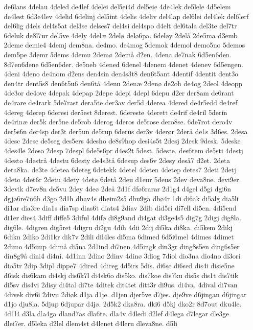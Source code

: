 {de6lans
4delau
4deled
de4lef
4delei
del5ei4d
del5eie
4de4lek
de5lele
4d5elem
de4lest
6d3e4lev
4delid
6delinj
del5int
4delis
4deliv
del4lap
del6lei
del4lek
del6lerf
del6lig
d4els
del4s5at
del3se
delses7
del4si
del4spo
d4elt
del6tala
del3te
del7tr
6deluk
de8l7ur
del5ve
4dely
4delæ
2delø
delø6pa.
6deløy
2delå
2de5ma
d3emb
2deme
demie4
4demj
dem8na.
de4mo.
de4mog
5demok
4demol
demo5no
5demos
dem5pe
3demr
5dems
4demu
2demø
2demå
d2en.
4dena
de7nak
6d5en6den.
8d7en6dene
6d5en6der.
de5neb
4dened
6denel
4denem
4denet
4denev
6d5engen.
4deni
4deno
de4nom
d2ens
den4sin
den4s3t8
den6t5ant
4dentif
4dentit
dent3o
den4tr
dent5s8
den6t5u6
den6tå
4denu
2denæ
2denø
de2ob
de4og
2deol
4deopp
4de3or
de4ove
4depak
4depap
2depe
4depi
4depl
6depu
d2er
der8am
de6rant
de4rare
de4rark
5de7rast
dera5te
der3av
der5d
4derea
4dered
de4r5edd
de4ref
4dereg
4derep
6deresi
der5est
8derest.
6dereste
4derett
de4rif
de4ril
5derin
de4rinæ
der5k
der5ne
de5rob
4derog
4deros
de5rose
dero8se.
6de7rot
dero4v
der5s6n
der4sp
der3t
der5un
de5rup
6derus
der3v
4derør
2derå
de1s
3d6es.
2desa
4desc
2dese
de5seg
des5ers
4desho
de8s9hop
desi4s5t
2desj
2desk
9desk.
5deske
4des4le
2deso
2desp
7despl
6de5s6pr
d4es2t
5dest.
5deste.
des6tem
de5sti
4destj
4desto
4destrå
4destu
6desty
de4s3tå
6desup
des6v
2desy
deså7
d2et.
2deta
deta8ka.
de3te
4detea
6deteg
6detekk
4detel
4deten
4detep
detes7
2deti
2detj
4deto
4det6r
2detu
4dety
4detø
6detå
2deu
d1eur
5deus
2dev
deva8ne.
devi9er.
3devik
d7ev8n
de5vu
2dey
4deø
2deå
2d1f
dfø6rarar
2d1g4
d4gel
d5gi
dgi6n
dgjø6re7n6h
d3go
2d1h
dhav4s
dheim2s5
dhu9ga
dhø4r
1di
di6ak
di5alg
dia5li
di1ar
dia3re
dia1s
dia7sp
dias6t
diats4
2diav
2dib
did5ri
di7ell
di5en.
4di5end
di1er
dies4
3diff
diffe5
3diful
4difø
di8g9and
di4gat
di3ge4s5
dig7g
2digj
dig8la.
dig6le.
4digren
dig5ret
4digru
di2gu
4dih
4dii
2dij
di5ka
di8ka.
di5kem
2dikj
6dikn
2diko
2di1kr
dik7v
2dili
dil4les
di5ma
6dimed
6d5i6mel
4dimes
4dimet
2dimo
4d5imp
4dimå
di5na
2d1ind
di7nen
4d5ingk
din3gr
ding8s5en
ding6s5er
din8g9å
dini4
di4ni.
4d1inn
2dino
2dinv
4dinø
3diog
7diol
dio3na
dio4no
di3ori
dio5tr
2dip
3dipl
dippe7
4dired
4direg
4d5irs
5dis.
di6sc
di6sed
dis4i
disie5ne
d6isk
dis6kam
di4skj
dis6k7l
di4sk6o
dis5ko.
dis7koe
dis7ku
dis5s
dis1t
dis7tik
di5sv
dis4vi
2disy
di4tal
di7te
4ditek
dit4tet
ditt3r
di9us.
di4va.
4dival
di7van
4divek
div6i
2divu
2diøk
d1ja
d1je.
d1jen
djer5ve
d7jes.
dje9ve
d6jingan
d6jingar
d1jo
dju8la.
5djup
6djupar
d4jø.
2d5k2
dka8ra.
dki6
d5kj
dko2r
8d7out
dku4le.
4d1l4
d3la
dla4ga
dland7as
dla6te.
dla4v
d4ledi
d2lef
d4lega
d7legar
dle3ge
dlei7er.
d5leka
d2lel
dlem4st
d4lenet
d4leru
dleva8ne.
d5li
}
